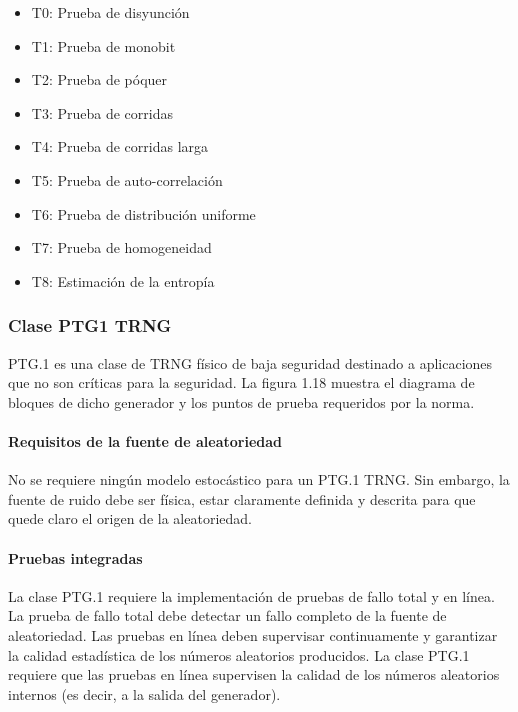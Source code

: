                 \begin{itemize}[noitemsep]
                    \item T0: Prueba de disyunción
                    \item T1: Prueba de monobit 
                    \item T2: Prueba de póquer
                    \item T3: Prueba de corridas
                    \item T4: Prueba de corridas larga
                    \item T5: Prueba de auto-correlación
                    \item T6: Prueba de distribución uniforme
                    \item T7: Prueba de homogeneidad
                    \item T8: Estimación de la entropía
                \end{itemize}
        
	\subsubsection{Clase PTG1 TRNG}
		PTG.1 es una clase de TRNG físico de baja seguridad destinado a aplicaciones que no son críticas para la seguridad. La figura 1.18 muestra el diagrama de bloques de dicho generador y los puntos de prueba requeridos por la norma.
		
		\paragraph{Requisitos de la fuente de aleatoriedad\\}
		
		No se requiere ningún modelo estocástico para un PTG.1 TRNG. Sin embargo, la fuente de ruido debe ser física, estar claramente definida y descrita para que quede claro el origen de la aleatoriedad.
		
		\paragraph{Pruebas integradas\\}
		
		La clase PTG.1 requiere la implementación de pruebas de fallo total y en línea. La prueba de fallo total debe detectar un fallo completo de la fuente de aleatoriedad. Las pruebas en línea deben supervisar continuamente y garantizar la calidad estadística de los números aleatorios producidos. La clase PTG.1 requiere que las pruebas en línea supervisen la calidad de los números aleatorios internos (es decir, a la salida del generador).
		
